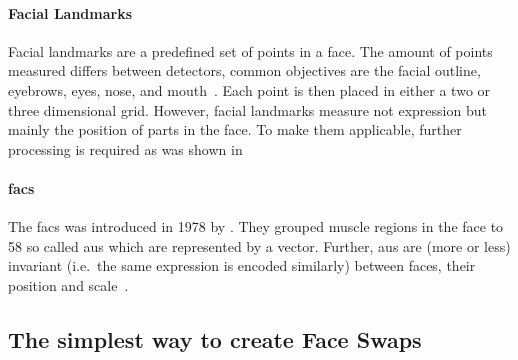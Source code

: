 \paragraph{Facial Landmarks}
Facial landmarks are a predefined set of points in a face. The amount of points
measured differs between detectors, common objectives are the facial outline,
eyebrows, eyes, nose, and mouth~\cite[cf.][]{Johnston.2018}. Each point is then
placed in either a two or three dimensional grid. However, facial landmarks
measure not expression but mainly the position of parts in the face. To make
them applicable, further processing is required as was shown in~\cite{Ha.2020}

\paragraph{\acrfull*{facs}}
The \gls{facs} was introduced in 1978 by \textcite{Ekman.1978}. They grouped
muscle regions in the face to 58 so called \glspl{au} which are represented
by a vector. Further, \glspl{au} are (more or less) invariant (i.e.\ the same
expression is encoded similarly) between faces, their position and scale~\cite{Pham.2018}.

\par



\subsection{The simplest way to create Face Swaps}

